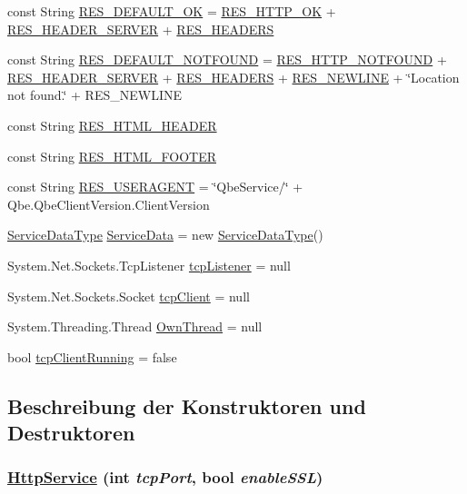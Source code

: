 \begin{CompactItemize}
\item 
const String \hyperlink{classQbeSAS_1_1HttpService_QbeSAS_1_1HttpServicer10}{RES\_\-DEFAULT\_\-OK} = \hyperlink{classQbeSAS_1_1HttpService_QbeSAS_1_1HttpServicer6}{RES\_\-HTTP\_\-OK} + \hyperlink{classQbeSAS_1_1HttpService_QbeSAS_1_1HttpServicer1}{RES\_\-HEADER\_\-SERVER} + \hyperlink{classQbeSAS_1_1HttpService_QbeSAS_1_1HttpServicer2}{RES\_\-HEADERS}
\item 
const String \hyperlink{classQbeSAS_1_1HttpService_QbeSAS_1_1HttpServicer11}{RES\_\-DEFAULT\_\-NOTFOUND} = \hyperlink{classQbeSAS_1_1HttpService_QbeSAS_1_1HttpServicer8}{RES\_\-HTTP\_\-NOTFOUND} + \hyperlink{classQbeSAS_1_1HttpService_QbeSAS_1_1HttpServicer1}{RES\_\-HEADER\_\-SERVER} + \hyperlink{classQbeSAS_1_1HttpService_QbeSAS_1_1HttpServicer2}{RES\_\-HEADERS} + \hyperlink{classQbeSAS_1_1HttpService_QbeSAS_1_1HttpServicer0}{RES\_\-NEWLINE} + \char`\"{}Location not found.\char`\"{} + RES\_\-NEWLINE
\item 
const String \hyperlink{classQbeSAS_1_1HttpService_QbeSAS_1_1HttpServicer12}{RES\_\-HTML\_\-HEADER}
\item 
const String \hyperlink{classQbeSAS_1_1HttpService_QbeSAS_1_1HttpServicer13}{RES\_\-HTML\_\-FOOTER}
\item 
const String \hyperlink{classQbeSAS_1_1HttpService_QbeSAS_1_1HttpServicer14}{RES\_\-USERAGENT} = \char`\"{}Qbe\-Service/\char`\"{} + Qbe.Qbe\-Client\-Version.Client\-Version
\item 
\hyperlink{classQbeSAS_1_1HttpService_1_1ServiceDataType}{Service\-Data\-Type} \hyperlink{classQbeSAS_1_1HttpService_QbeSAS_1_1HttpServicer15}{Service\-Data} = new \hyperlink{classQbeSAS_1_1HttpService_1_1ServiceDataType}{Service\-Data\-Type}()
\item 
System.Net.Sockets.Tcp\-Listener \hyperlink{classQbeSAS_1_1HttpService_QbeSAS_1_1HttpServicer16}{tcp\-Listener} = null
\item 
System.Net.Sockets.Socket \hyperlink{classQbeSAS_1_1HttpService_QbeSAS_1_1HttpServicer17}{tcp\-Client} = null
\item 
System.Threading.Thread \hyperlink{classQbeSAS_1_1HttpService_QbeSAS_1_1HttpServicer18}{Own\-Thread} = null
\item 
bool \hyperlink{classQbeSAS_1_1HttpService_QbeSAS_1_1HttpServicer19}{tcp\-Client\-Running} = false
\end{CompactItemize}


\subsection{Beschreibung der Konstruktoren und Destruktoren}
\hypertarget{classQbeSAS_1_1HttpService_QbeSAS_1_1HttpServicea0}{
\subsubsection[HttpService]{\setlength{\rightskip}{0pt plus 5cm}\hyperlink{classQbeSAS_1_1HttpService}{Http\-Service} (int {\em tcp\-Port}, bool {\em enable\-SSL})}}
\label{classQbeSAS_1_1HttpService_QbeSAS_1_1HttpServicea0}


